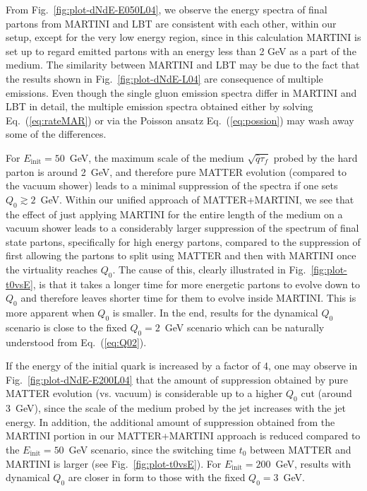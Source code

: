 \documentclass[aps,prc,twocolumn,floatfix,superscriptaddress,nofootinbib]{revtex4}
\begin{document}
From Fig.~\ref{fig:plot-dNdE-E050L04}, we observe the energy spectra of final partons from MARTINI and LBT are consistent with each other, within our setup, except for the very low energy region, since in this calculation MARTINI is set up to regard emitted partons with an energy less than 2 GeV as a part of the medium. The similarity between MARTINI and LBT may be due to the fact that the results shown in Fig.~\ref{fig:plot-dNdE-L04} are consequence of multiple emissions. Even though the single gluon emission spectra differ in MARTINI and LBT in detail, the multiple emission spectra obtained either by solving Eq.~(\ref{eq:rateMAR}) or via the Poisson ansatz Eq.~(\ref{eq:possion}) may wash away some of the differences.


For $E_\mathrm{init}=50$~GeV, the maximum scale of the medium $\sqrt{\hat{q}\tau_f}$ probed by the hard parton is around 2~GeV, and therefore pure MATTER evolution (compared to the vacuum shower) leads to a minimal suppression of the spectra if one sets $Q_0\gtrsim2$~GeV. Within our unified approach of MATTER+MARTINI, we see that the effect of just applying MARTINI for the entire length of the medium on a vacuum shower leads to a considerably larger suppression of the spectrum of final state partons, specifically for high energy partons, compared to the suppression of first allowing the partons to split using MATTER and then with MARTINI once the virtuality reaches $Q_0$.
The cause of this, clearly illustrated in Fig.~\ref{fig:plot-t0vsE},  is that it takes a longer time for more energetic partons to evolve down to $Q_0$ and therefore leaves shorter time for them to evolve inside MARTINI. This is more apparent when $Q_0$ is smaller. In the end, results for the dynamical $Q_0$ scenario is close to the fixed $Q_0=2$~GeV scenario which can be naturally understood from Eq.~(\ref{eq:Q02}).

If the energy of the initial quark is increased by a factor of 4, one may observe in Fig.~\ref{fig:plot-dNdE-E200L04} that the amount of suppression obtained by pure MATTER evolution (vs. vacuum) is considerable up to a higher $Q_0$ cut (around 3~GeV), since the scale of the medium probed by the jet increases with the jet energy. In addition, the additional amount of suppression obtained from the MARTINI portion in our MATTER+MARTINI approach is reduced compared to the $E_\mathrm{init}=50$~GeV scenario, since the switching time $t_0$ between MATTER and MARTINI is larger (see Fig.~\ref{fig:plot-t0vsE}). For $E_\mathrm{init}= 200$~GeV, results with dynamical $Q_0$ are closer in form to those with the fixed $Q_0=3$~GeV. 
\end{document}
